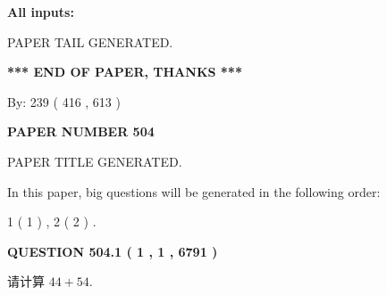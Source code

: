 \documentclass{ctexart}
\begin{document}
   
   
   
\noindent\vspace{0.1in}\hspace{-0.08in} {\textbf{\Large{All inputs: }}}
   
   
   
   
   
   
 \vspace{0.2in}
 
   
   
\vspace{2.0in} PAPER TAIL GENERATED.
   
   
   
   
\vspace{1.0in} 
{\textbf{\large{ *** END OF PAPER, THANKS *** }}} 
   
   
\hspace{1.0in} By: 
 239 ( 416 ,  613 )
   
   
   
   
\newpage 
\setcounter{page}{ 
   504001 } 
   
   
   
   
 {\textbf{ \Large{ PAPER NUMBER  504  }}}
   
   
\vspace{0.2in}
   
   
   
   
   
   
   
   
 \vspace{0.2in}
 
 
 
 
   
   
 PAPER TITLE GENERATED.
   
   
   
\vspace{0.2in}
   
In this paper, big questions will be generated in the following order: 
   
   
   1 ( 1 )
 ,
   2 ( 2 )
 .
  
\vspace{0.2in}
  
{\textbf{\Large{QUESTION
504.1 
 ( 1 , 1 , 6791 )
}}}
  
  
 
请计算 $ %
44 +  %
54 $.
 
 
 
\noindent{}
 
\end{document}
